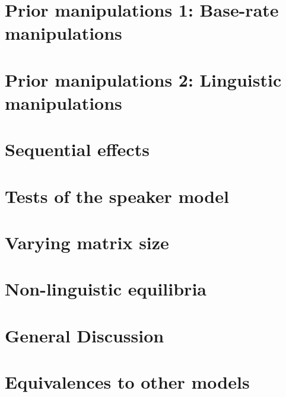 \documentclass[man,noapacite]{apa2}
\begin{document}
\section{Prior manipulations 1: Base-rate manipulations}




\section{Prior manipulations 2: Linguistic manipulations}

\section{Sequential effects}

\section{Tests of the speaker model}

\section{Varying matrix size}

\section{Non-linguistic equilibria}



\section{General Discussion}


\newpage




\theappendix

\section{Equivalences to other models}

\end{document}
